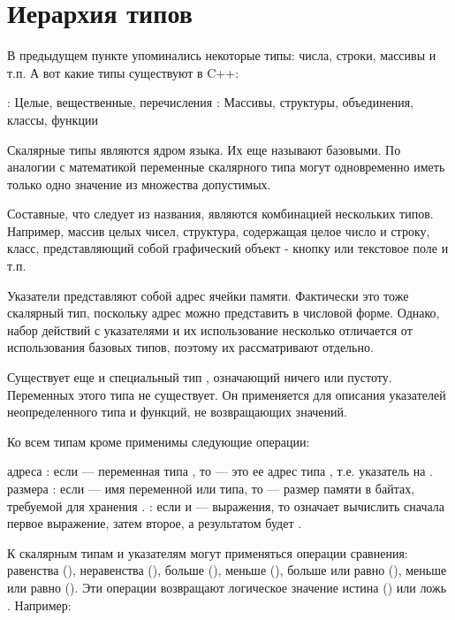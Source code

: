 \documentclass[book.tex]{subfiles}
\begin{document}
\section*{Иерархия типов}

В предыдущем пункте упоминались некоторые типы: числа, строки, массивы и т.п. А вот какие типы существуют в C++:

\begin{itemize}
: Целые, вещественные, перечисления
: Массивы, структуры, объединения, классы, функции
\end{itemize}

Скалярные типы являются ядром языка. Их еще называют базовыми. По аналогии с математикой переменные скалярного типа могут одновременно иметь только одно значение из множества допустимых.

Составные, что следует из названия, являются комбинацией нескольких типов.  Например, массив целых чисел, структура, содержащая целое число и строку, класс, представляющий собой графический объект - кнопку или текстовое поле и т.п.

Указатели представляют собой адрес ячейки памяти. Фактически это тоже скалярный тип, поскольку адрес можно представить в числовой форме. Однако, набор действий с указателями и их использование несколько отличается от использования базовых типов, поэтому их рассматривают отдельно.

Существует еще и специальный тип , означающий ничего или пустоту. Переменных этого типа не существует. Он применяется для описания указателей неопределенного типа и функций, не возвращающих значений.

Ко всем типам кроме  применимы следующие операции:

\begin{itemize}
 адреса \cppword{\&}: если  --- переменная типа , то  --- это ее адрес типа , т.е. указатель на .
 размера : если  --- имя переменной или типа, то  --- размер памяти в байтах, требуемой для хранения .
 \cppword{,}: если  и  --- выражения, то  означает вычислить сначала первое выражение, затем второе, а результатом будет .  
\end{itemize}

К скалярным типам и указателям могут применяться операции сравнения: равенства (\cppword{==}), неравенства (\cppword{!=}), больше (\cppword{>}), меньше (\cppword{<}), больше или равно (\cppword{>=}), меньше или равно (\cppword{<=}). Эти операции возвращают логическое значение истина () или ложь . Например:
\end{document}
